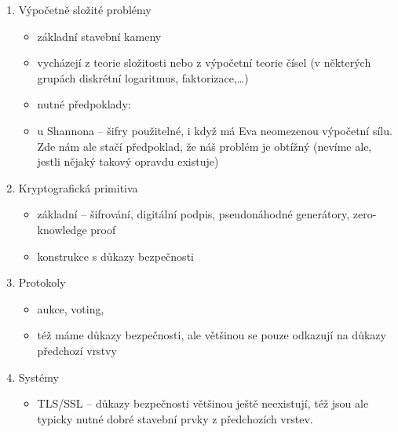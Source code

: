 \documentclass[a4paper,12pt,titlepage]{article}
\begin{document}
\begin{enumerate}

\item Výpočetně složité problémy

\begin{itemize}

\item základní stavební kameny

\item vycházejí z teorie složitosti nebo z výpočetní teorie čísel (v některých grupách diskrétní logaritmus, faktorizace,\dots)

\item nutné předpoklady:

\item u Shannona -- šifry použitelné, i když má Eva neomezenou výpočetní sílu. Zde nám ale stačí předpoklad, že náš problém je obtížný (nevíme ale, jestli nějaký takový opravdu existuje)

\end{itemize}

\item Kryptografická primitiva

\begin{itemize}

\item základní  -- šifrování, digitální podpis,
pseudonáhodné generátory, zero-knowledge proof

\item konstrukce s důkazy bezpečnosti

\end{itemize}

\item Protokoly

\begin{itemize}

\item aukce, voting,

\item též máme důkazy bezpečnosti, ale většinou se pouze odkazují na důkazy
předchozí vrstvy

\end{itemize}

\item Systémy

\begin{itemize}

\item TLS/SSL -- důkazy bezpečnosti většinou ještě neexistují, též jsou ale
typicky nutné dobré stavební prvky z předchozích vrstev.

\end{itemize}

\end{enumerate}
\end{document}
